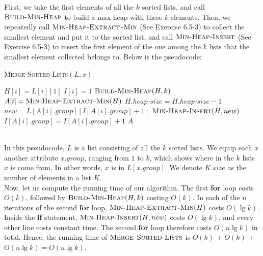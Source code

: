 \documentclass[12pt,reqno]{amsart}
\newif\ifanswer
\begin{document}
\begin{enumerate}[1.]
\ifanswer
{}
First, we take the first elements of all the $k$ sorted lists, and call $\textsc{Build-Min-Heap}$ to build a max heap with these $k$ elements. Then, we repeatedly call $\textsc{Min-Heap-Extract}$-$\textsc{Min}$ (See Exercise 6.5-3) to collect the smallest element and put it to the sorted list, and call $\textsc{Min-Heap-Insert}$ (See Exercise 6.5-3) to insert the first element of the one among the $k$ lists that the smallest element collected belongs to. Below is the pseudocode:
\begin{algorithm}
    \caption{\textsc{Merge-Sorted-Lists}$(L, x)$}
    \begin{algorithmic}[1]
            \STATE $H[i] = L[i][1]$
            \STATE $I[i] = 1$
        \ENDFOR
        \STATE $\textsc{Build-Min-Heap}(H, k)$
            \STATE $A[i] = \textsc{Min-Heap-Extract-Min}(H)$
            \STATE $H.heap$-$size = H.heap$-$size - 1$
                \STATE $new = L[A[i].group][I[A[i].group] + 1]$
                \STATE $\textsc{Min-Heap-Insert}(H, new)$
                \STATE $I[A[i].group] = I[A[i].group] + 1$
            \ENDIF
        \ENDFOR
        \RETURN $A$
    \end{algorithmic}
\end{algorithm}
\\In this pseudocode, $L$ is a list consisting of all the $k$ sorted lists. We equip each $x$ another attribute $x.group$, ranging from $1$ to $k$, which shows where in the $k$ lists $x$ is come from. In other words, $x$ is in $L[x.group]$. We denote $K.size$ as the number of elements in a list $K$.\\
Now, let us compute the running time of our algorithm. The first \textbf{for} loop costs $O(k)$, followed by $\textsc{Build-Min-Heap}(H, k)$ costing $O(k)$. In each of the $n$ iterations of the second \textbf{for} loop, $\textsc{Min-Heap-Extract-Min}(H)$ costs $O(\lg{k})$. Inside the \textbf{if} statement, $\textsc{Min-Heap-Insert}(H, new)$ costs $O(\lg{k})$, and every other line costs constant time. The second \textbf{for} loop therefore costs $O(n\lg{k})$ in total. Hence, the running time of $\textsc{Merge}$-$\textsc{Sorted-Lists}$ is $O(k)$ + $O(k)$ + $O(n\lg{k}) = O(n\lg{k})$.
\vspace{1cm}
\end{enumerate}
\end{document}
